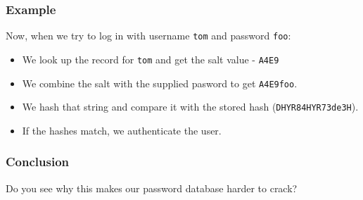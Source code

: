 \documentclass[10pt]{beamer}
\begin{document}
\begin{frame}
	\frametitle{Example}
	
	Now, when we try to log in with username \texttt{tom} and password
	\texttt{foo}:
	
	\begin{itemize}
		\item We look up the record for \texttt{tom} and get the salt value - \texttt{A4E9}
		\item We combine the salt with the supplied pasword to get \texttt{A4E9foo}.
		\item We hash that string and compare it with the stored hash (\texttt{DHYR84HYR73de3H}).
		\item If the hashes match, we authenticate the user.
	\end{itemize}
	
\end{frame}

\begin{frame}
	\frametitle{Conclusion}

	Do you see why this makes our password database harder to crack?
\end{frame}
					
\end{document}
